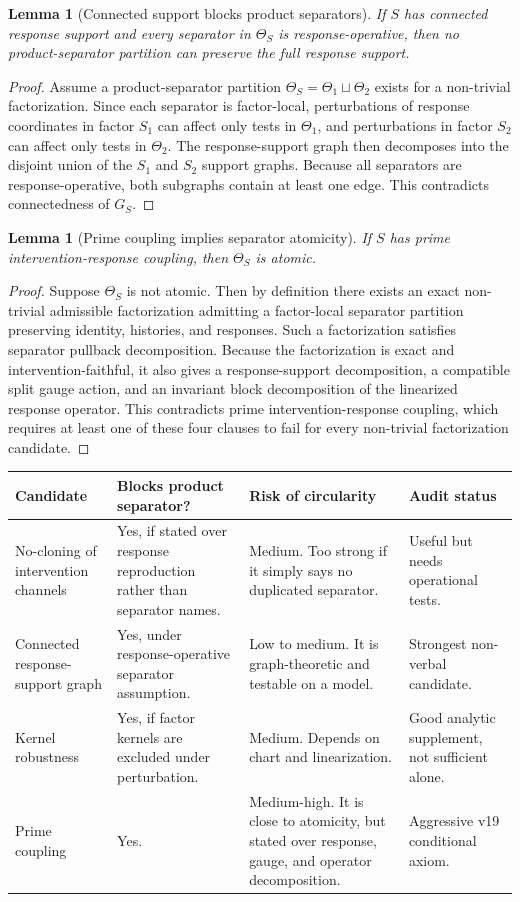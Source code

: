 \documentclass[11pt]{article}
\newtheorem{lemma}[definition]{Lemma}
\begin{document}
\begin{lemma}[Connected support blocks product separators]
If $S$ has connected response support and every separator in $\Theta_S$ is response-operative, then no product-separator partition can preserve the full response support.
\end{lemma}

\begin{proof}
Assume a product-separator partition $\Theta_S=\Theta_1\sqcup\Theta_2$ exists for a non-trivial factorization. Since each separator is factor-local, perturbations of response coordinates in factor $S_1$ can affect only tests in $\Theta_1$, and perturbations in factor $S_2$ can affect only tests in $\Theta_2$. The response-support graph then decomposes into the disjoint union of the $S_1$ and $S_2$ support graphs. Because all separators are response-operative, both subgraphs contain at least one edge. This contradicts connectedness of $G_S$.
\end{proof}

\begin{lemma}[Prime coupling implies separator atomicity]
If $S$ has prime intervention-response coupling, then $\Theta_S$ is atomic.
\end{lemma}

\begin{proof}
Suppose $\Theta_S$ is not atomic. Then by definition there exists an exact non-trivial admissible factorization admitting a factor-local separator partition preserving identity, histories, and responses. Such a factorization satisfies separator pullback decomposition. Because the factorization is exact and intervention-faithful, it also gives a response-support decomposition, a compatible split gauge action, and an invariant block decomposition of the linearized response operator. This contradicts prime intervention-response coupling, which requires at least one of these four clauses to fail for every non-trivial factorization candidate.
\end{proof}

\begin{longtable}{p{}p{}p{}p{}}
\toprule
Candidate & Blocks product separator? & Risk of circularity & Audit status \\
\midrule
No-cloning of intervention channels & Yes, if stated over response reproduction rather than separator names. & Medium. Too strong if it simply says no duplicated separator. & Useful but needs operational tests. \\
Connected response-support graph & Yes, under response-operative separator assumption. & Low to medium. It is graph-theoretic and testable on a model. & Strongest non-verbal candidate. \\
Kernel robustness & Yes, if factor kernels are excluded under perturbation. & Medium. Depends on chart and linearization. & Good analytic supplement, not sufficient alone. \\
Prime coupling & Yes. & Medium-high. It is close to atomicity, but stated over response, gauge, and operator decomposition. & Aggressive v19 conditional axiom. \\
\bottomrule
\end{longtable}
\end{document}
